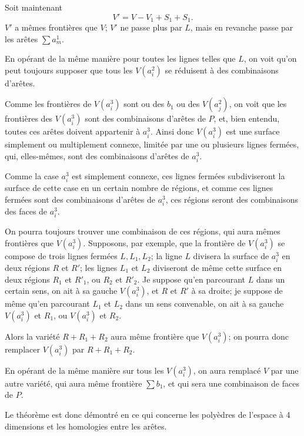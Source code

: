 \documentclass{article}
\begin{document}
Soit maintenant
\[ V' = V - V_{1} + S_{1} + S_{1}. \]
$V'$ a mêmes frontières que $V$; $V'$ ne passe plus par $L$, mais en revanche passe par les arêtes $\displaystyle\sum a^{1}_{m}$.

En opérant de la même manière pour toutes les lignes telles que $L$, on voit qu'on peut toujours supposer que tous les $V(a^{2}_{i})$ se réduisent à des combinaisons d'arêtes.

Comme les frontières de $V(a^{3}_{i})$ sont ou des $b_{1}$ ou des $V(a^{2}_{j})$, on voit que les frontières des $V(a^{3}_{i})$ sont des combinaisons d'arêtes de $P$, et, bien entendu, toutes ces arêtes doivent appartenir à $a^{3}_{i}$. Ainsi donc $V(a^{3}_{i})$ est une surface simplement ou multiplement connexe, limitée par une ou plusieurs lignes fermées, qui, elles-mêmes, sont des combinaisons d'arêtes de $a^{3}_{i}$.

Comme la case $a^{3}_{i}$ est simplement connexe, ces lignes fermées subdiviseront la surface de cette case en un certain nombre de régions, et comme ces lignes fermées sont des combinaisons d'arêtes de $a^{3}_{i}$, ces régions seront des combinaisons des faces de $a^{3}_{i}$.

On pourra toujours trouver une combinaison de ces régions, qui aura mêmes frontières que $V(a^{3}_{i})$. Supposons, par exemple, que la frontière de $V(a^{3}_{i})$ se compose de trois lignes fermées $L, L_{1}, L_{2}$; la ligne $L$ divisera la surface de $a^{3}_{i}$ en deux régions $R$ et $R'$; les lignes $L_{1}$ et $L_{2}$ diviseront de même cette surface en deux régions $R_{1}$ et $R'_{1}$, ou $R_{2}$ et $R'_{2}$. Je suppose qu'en parcourant $L$ dans un certain sens, on ait à sa gauche $V(a^{3}_{i})$, et $R$ et $R'$ à sa droite; je suppose de même qu'en parcourant $L_{1}$ et $L_{2}$ dans un sens convenable, on ait à sa gauche $V(a^{3}_{i})$ et $R_{1}$, ou $V(a^{3}_{i})$ et $R_{2}$.

Alors la variété $R + R_{1} + R_{2}$ aura même frontière que $V(a^{3}_{i})$; on pourra donc remplacer $V(a^{3}_{i})$ par $R + R_{1} + R_{2}$.


En opérant de la même manière sur tous les $V(a^{3}_{i})$, on aura remplacé $V$ par une autre variété, qui aura même frontière $\displaystyle\sum b_{1}$, et qui sera une combinaison de faces de $P$.

Le théorème est donc démontré en ce qui concerne les polyèdres de l'espace à 4 dimensions et les homologies entre les arêtes.
\end{document}
